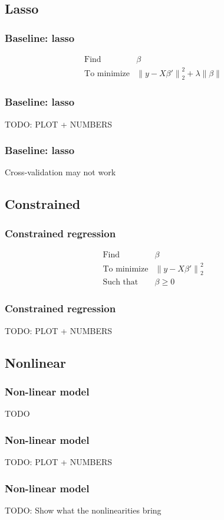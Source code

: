 \documentclass[a4paper,12pt,compress,serif]{beamer}
\def\n#1{\left\|#1\right\|}
\let\geq\geqslant
\begin{document}
\subsection{Lasso}
\begin{frame}
  \frametitle{Baseline: lasso}
  \[
  \begin{array}{ll}
    \text{Find} & \beta \\
    \text{To minimize} & \n{ y - X \beta ' }_2^2 + \lambda \n{ \beta }
  \end{array}
  \]
\end{frame}

\begin{frame}
  \frametitle{Baseline: lasso}
  TODO: PLOT + NUMBERS
\end{frame}

\begin{frame}
  \frametitle{Baseline: lasso}
  Cross-validation may not work
\end{frame}

\subsection{Constrained}
\begin{frame}
  \frametitle{Constrained regression}
  \[
  \begin{array}{ll}
    \text{Find} & \beta \\
    \text{To minimize} & \n{ y - X \beta ' }_2^2 \\
    \text{Such that} & \beta \geq 0
  \end{array}
  \]
\end{frame}

\begin{frame}
  \frametitle{Constrained regression}
  TODO: PLOT + NUMBERS
\end{frame}

\subsection{Nonlinear}
\begin{frame}
  \frametitle{Non-linear model}
  TODO
\end{frame}

\begin{frame}
  \frametitle{Non-linear model}
  TODO: PLOT + NUMBERS
\end{frame}

\begin{frame}
  \frametitle{Non-linear model}
  TODO: Show what the nonlinearities bring
\end{frame}
\end{document}

